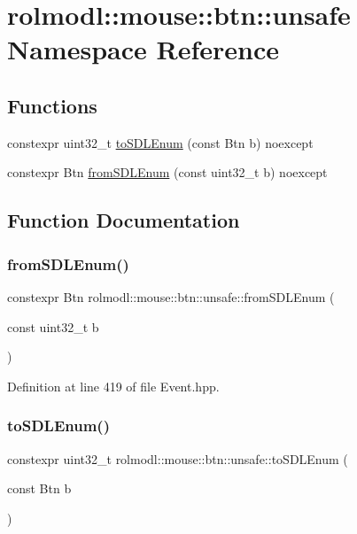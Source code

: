 \hypertarget{namespacerolmodl_1_1mouse_1_1btn_1_1unsafe}{}\section{rolmodl\+::mouse\+::btn\+::unsafe Namespace Reference}
\label{namespacerolmodl_1_1mouse_1_1btn_1_1unsafe}
\subsection*{Functions}
\begin{DoxyCompactItemize}
\item 
constexpr uint32\+\_\+t \mbox{\hyperlink{namespacerolmodl_1_1mouse_1_1btn_1_1unsafe_a3acd80e81421c86b8b60b6e0240dc1da}{to\+S\+D\+L\+Enum}} (const Btn b) noexcept
\item 
constexpr Btn \mbox{\hyperlink{namespacerolmodl_1_1mouse_1_1btn_1_1unsafe_aa587bfa9b3c346db3c06bcc5e60d499b}{from\+S\+D\+L\+Enum}} (const uint32\+\_\+t b) noexcept
\end{DoxyCompactItemize}


\subsection{Function Documentation}
\mbox{\label{namespacerolmodl_1_1mouse_1_1btn_1_1unsafe_aa587bfa9b3c346db3c06bcc5e60d499b}} 
\subsubsection{\texorpdfstring{fromSDLEnum()}{fromSDLEnum()}}
{\footnotesize\ttfamily constexpr Btn rolmodl\+::mouse\+::btn\+::unsafe\+::from\+S\+D\+L\+Enum (\begin{DoxyParamCaption}\item[{const uint32\+\_\+t}]{b }\end{DoxyParamCaption})\hspace{0.3cm}{\ttfamily [noexcept]}}



Definition at line 419 of file Event.\+hpp.

\mbox{\label{namespacerolmodl_1_1mouse_1_1btn_1_1unsafe_a3acd80e81421c86b8b60b6e0240dc1da}} 
\subsubsection{\texorpdfstring{toSDLEnum()}{toSDLEnum()}}
{\footnotesize\ttfamily constexpr uint32\+\_\+t rolmodl\+::mouse\+::btn\+::unsafe\+::to\+S\+D\+L\+Enum (\begin{DoxyParamCaption}\item[{const Btn}]{b }\end{DoxyParamCaption})\hspace{0.3cm}{\ttfamily [noexcept]}}

